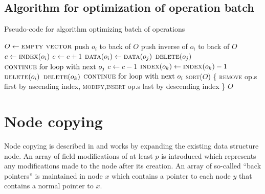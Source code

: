 \subsection{Algorithm for optimization of operation batch}
\begin{algorithm}
  \caption{Pseudo-code for algorithm optimizing batch of operations}
  \begin{algorithmic}[1]
      \State $O \gets \textsc{empty vector}$
          \State push $o_i$ to back of $O$
        \Else
          \State push inverse of $o_i$ to back of $O$
        \EndIf
      \EndFor
          \State $c \gets \textsc{index}(o_i)$
              \State $c \gets c+1$
              \State $\textsc{data}(o_i) \gets \textsc{data}(o_j)$
              \State $\textsc{delete}(o_j)$
              \State $\textsc{continue}\textnormal{ for loop with next }o_j$
                \State $c \gets c-1$
                  \State $\textsc{index}(o_k) \gets \textsc{index}(o_k) - 1$
                \EndFor
                \State $\textsc{delete}(o_i)$
                \State $\textsc{delete}(o_k)$
                \State $\textsc{continue}\textnormal{ for loop with next }o_i$
              \EndIf
            \EndIf
          \EndFor
        \EndIf
      \EndFor
      \Statex
      \State \textsc{sort}($O$) \{
      \State \hspace{12pt} \textsc{remove} op.s first by ascending index,
      \State \hspace{12pt} \textsc{modify},\textsc{insert} op.s last by descending index
      \State \}
      \Statex
      \State \Return $O$
    \EndFunction
  \end{algorithmic}
\end{algorithm}

\section{Node copying}
Node copying is described in \cite{Driscoll198986} and works by expanding the
existing data structure node. An array of field modifications of at least $p$ is
introduced which represents any modifications made to the node after its
creation. An array of so-called ``back pointers'' is maintained in node $x$
which contains a pointer to each node $y$ that contains a normal pointer to $x$.

